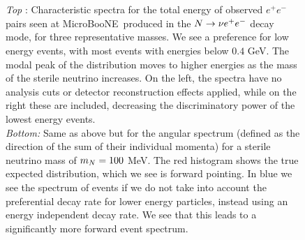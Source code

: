 \documentclass[11pt, a4paper]{article}
\def\muboone{MicroBooNE}
\def\ster{\ensuremath N}
\begin{document}
\begin{figure}[t]
\begin{subfigure}[t]{\textwidth}
	\center
	\large

	\resizebox{\columnwidth}{!}{}\\

\end{subfigure}\\

\begin{subfigure}[c]{\textwidth}
	\center
	\large
	\resizebox{0.7\columnwidth}{!}{}

	\end{subfigure}

	\caption{\label{fig:spectrum_ee} \emph{Top} : Characteristic spectra for the total energy of observed  $e^+e^-$ pairs seen at \muboone\ produced in the $\ster \to \nu e^+e^-$ decay mode, for three representative masses. We see a preference for low energy events, with most events with energies below $0.4$ GeV. The modal peak of the distribution moves to higher energies as the mass of the sterile neutrino increases. On the left, the spectra have no analysis cuts or detector reconstruction effects applied, while on the right these are included, decreasing the discriminatory power of the lowest energy events.\\
		\emph{Bottom: }	 Same as above but for the angular spectrum (defined as the direction of the sum of their individual momenta) for a sterile neutrino mass of $m_\ster = 100$ MeV. The red histogram shows the true expected distribution, which we see is forward pointing. In blue we see the spectrum of events if we do not take into account the preferential
		decay rate for lower energy particles, instead using an energy independent
		decay rate. We see that this leads to a significantly more forward event 
		spectrum.	}
\end{figure}
\end{document}
